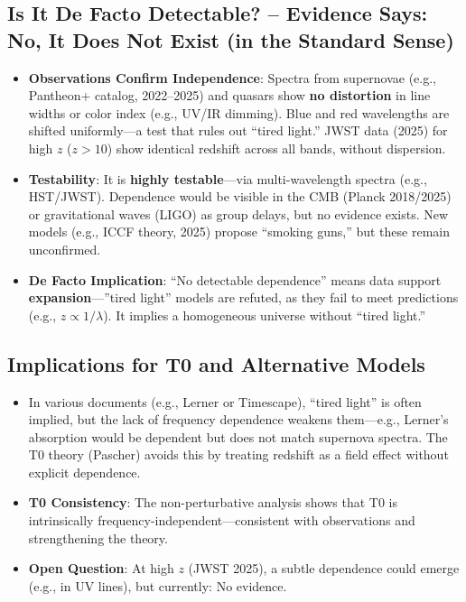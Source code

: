 	\subsection{Is It De Facto Detectable? – Evidence Says: No, It Does Not Exist (in the Standard Sense)}
	
	\begin{itemize}
		\item \textbf{Observations Confirm Independence}: Spectra from supernovae (e.g., Pantheon+ catalog, 2022–2025) and quasars show \textbf{no distortion} in line widths or color index (e.g., UV/IR dimming). Blue and red wavelengths are shifted uniformly—a test that rules out ``tired light.'' JWST data (2025) for high $z$ ($z>10$) show identical redshift across all bands, without dispersion.
		\item \textbf{Testability}: It is \textbf{highly testable}—via multi-wavelength spectra (e.g., HST/JWST). Dependence would be visible in the CMB (Planck 2018/2025) or gravitational waves (LIGO) as group delays, but no evidence exists. New models (e.g., ICCF theory, 2025) propose ``smoking guns,'' but these remain unconfirmed.
		\item \textbf{De Facto Implication}: ``No detectable dependence'' means data support \textbf{expansion}—''tired light'' models are refuted, as they fail to meet predictions (e.g., $z \propto 1/\lambda$). It implies a homogeneous universe without ``tired light.''
	\end{itemize}
	
	\subsection{Implications for T0 and Alternative Models}
	
	\begin{itemize}
		\item In various documents (e.g., Lerner or Timescape), ``tired light'' is often implied, but the lack of frequency dependence weakens them—e.g., Lerner’s absorption would be dependent but does not match supernova spectra. The T0 theory (Pascher) avoids this by treating redshift as a field effect without explicit dependence.
		\item \textbf{T0 Consistency}: The non-perturbative analysis shows that T0 is intrinsically frequency-independent—consistent with observations and strengthening the theory.
		\item \textbf{Open Question}: At high $z$ (JWST 2025), a subtle dependence could emerge (e.g., in UV lines), but currently: No evidence.
	\end{itemize}
	
